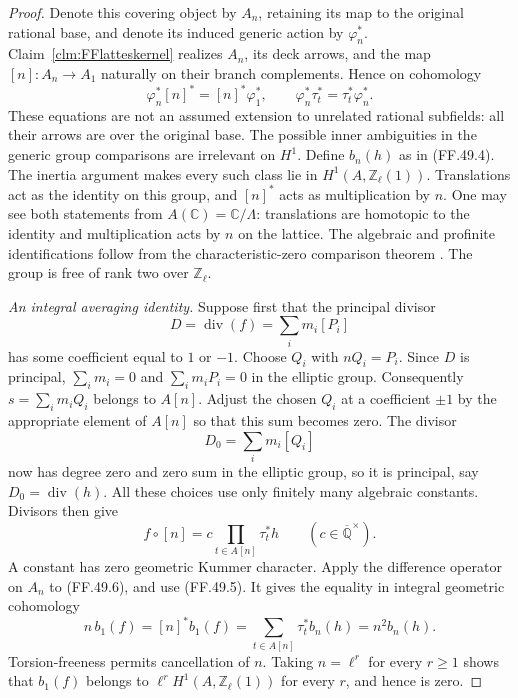\begin{proof}
Denote this covering object by \(A_n\), retaining
its map to the original rational base, and denote
its induced generic action by \(\varphi_n^*\).
Claim~\ref{clm:FFlatteskernel} realizes \(A_n\),
its deck arrows, and the map
\([n]:A_n\to A_1\) naturally on their branch
complements. Hence on cohomology
\[
 \varphi_n^*[n]^*=[n]^*\varphi_1^*,\qquad
 \varphi_n^*\tau_t^*=\tau_t^*\varphi_n^*.
                                                        \tag{FF.49.5}
\]
These equations are not an assumed extension to
unrelated rational subfields: all their arrows are
over the original base. The possible inner
ambiguities in the generic group comparisons are
irrelevant on \(H^1\).
Define \(b_n(h)\) as in (FF.49.4). The inertia
argument makes every such class lie in
\(H^1(A,\mathbb Z_\ell(1))\).
Translations act as the identity on this group,
and \([n]^*\) acts as multiplication by \(n\).
One may see both statements from
\(A(\mathbb C)=\mathbb C/\Lambda\): translations
are homotopic to the identity and multiplication
acts by \(n\) on the lattice. The algebraic and
profinite identifications follow from the
characteristic-zero comparison theorem
\citep[Expose~XII, Theoreme~5.1]{FF_SGA1}.
The group is free of rank two over \(\mathbb Z_\ell\).

\emph{An integral averaging identity.}
Suppose first that the principal divisor
\[
                       D=\operatorname{div}(f)
                              =\sum_i m_i[P_i]
\]
has some coefficient equal to \(1\) or \(-1\).
Choose \(Q_i\) with \(nQ_i=P_i\). Since \(D\)
is principal, \(\sum_i m_i=0\) and
\(\sum_i m_iP_i=0\) in the elliptic group.
Consequently \(s=\sum_i m_iQ_i\) belongs to
\(A[n]\). Adjust the chosen \(Q_i\) at a
coefficient \(\pm1\) by the appropriate element
of \(A[n]\) so that this sum becomes zero.
The divisor
\[
                         D_0=\sum_i m_i[Q_i]
\]
now has degree zero and zero sum in the elliptic
group, so it is principal, say
\(D_0=\operatorname{div}(h)\).
All these choices use only finitely many algebraic
constants. Divisors then give
\[
          f\circ[n]=c\prod_{t\in A[n]}\tau_t^*h
                  \qquad(c\in\overline{\mathbb Q}^{\times}).
                                                        \tag{FF.49.6}
\]
A constant has zero geometric Kummer character.
Apply the difference operator on \(A_n\) to
(FF.49.6), and use (FF.49.5). It gives the equality
in integral geometric cohomology
\[
           n\,b_1(f)
              =[n]^*b_1(f)
              =\sum_{t\in A[n]}\tau_t^*b_n(h)
              =n^2b_n(h).
                                                        \tag{FF.49.7}
\]
Torsion-freeness permits cancellation of \(n\).
Taking \(n=\ell^r\) for every \(r\ge1\) shows
that \(b_1(f)\) belongs to
\(\ell^r H^1(A,\mathbb Z_\ell(1))\) for every
\(r\), and hence is zero.


\end{proof}
